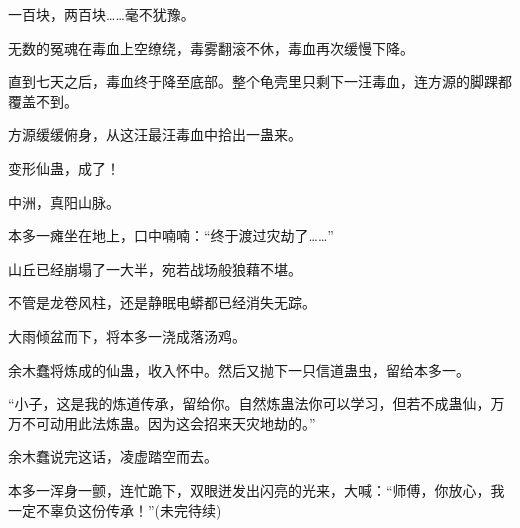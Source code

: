 \begin{this_body}
一百块，两百块……毫不犹豫。

无数的冤魂在毒血上空缭绕，毒雾翻滚不休，毒血再次缓慢下降。

直到七天之后，毒血终于降至底部。整个龟壳里只剩下一汪毒血，连方源的脚踝都覆盖不到。

方源缓缓俯身，从这汪最汪毒血中拾出一蛊来。

变形仙蛊，成了！

中洲，真阳山脉。

本多一瘫坐在地上，口中喃喃：“终于渡过灾劫了……”

山丘已经崩塌了一大半，宛若战场般狼藉不堪。

不管是龙卷风柱，还是静眠电蟒都已经消失无踪。

大雨倾盆而下，将本多一浇成落汤鸡。

余木蠢将炼成的仙蛊，收入怀中。然后又抛下一只信道蛊虫，留给本多一。

“小子，这是我的炼道传承，留给你。自然炼蛊法你可以学习，但若不成蛊仙，万万不可动用此法炼蛊。因为这会招来天灾地劫的。”

余木蠢说完这话，凌虚踏空而去。

本多一浑身一颤，连忙跪下，双眼迸发出闪亮的光来，大喊：“师傅，你放心，我一定不辜负这份传承！”(未完待续)

\end{this_body}

